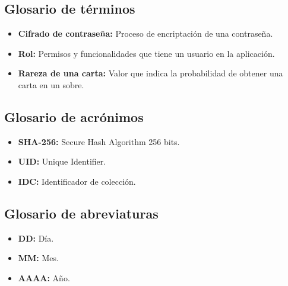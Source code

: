 \subsection{Glosario de términos}
\begin{itemize}
    \item \textbf{Cifrado de contraseña:} Proceso de encriptación de una contraseña.
    \item \textbf{Rol:} Permisos y funcionalidades que tiene un usuario en la aplicación.
    \item \textbf{Rareza de una carta:} Valor que indica la probabilidad de obtener una carta en un sobre.
\end{itemize}

\subsection{Glosario de acrónimos}
\begin{itemize}
    \item \textbf{SHA-256:} Secure Hash Algorithm 256 bits.
    \item \textbf{UID:} Unique Identifier.
    \item \textbf{IDC:} Identificador de colección.
\end{itemize}

\subsection{Glosario de abreviaturas}
\begin{itemize}
    \item \textbf{DD:} Día.
    \item \textbf{MM:} Mes.
    \item \textbf{AAAA:} Año.
\end{itemize}

